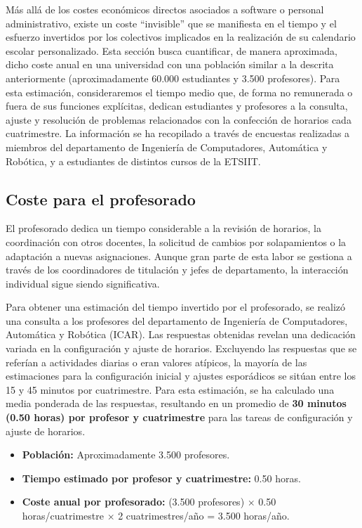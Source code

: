 Más allá de los costes económicos directos asociados a software o personal administrativo, existe un coste ``invisible'' que se manifiesta en el tiempo y el esfuerzo invertidos por los colectivos implicados en la realización de su calendario escolar personalizado. Esta sección busca cuantificar, de manera aproximada, dicho coste anual en una universidad con una población similar a la descrita anteriormente (aproximadamente 60.000 estudiantes y 3.500 profesores).
\newline\newline
Para esta estimación, consideraremos el tiempo medio que, de forma no remunerada o fuera de sus funciones explícitas, dedican estudiantes y profesores a la consulta, ajuste y resolución de problemas relacionados con la confección de horarios cada cuatrimestre. La información se ha recopilado a través de encuestas realizadas a miembros del departamento de Ingeniería de Computadores, Automática y Robótica, y a estudiantes de distintos cursos de la ETSIIT.

\subsection{Coste para el profesorado}

El profesorado dedica un tiempo considerable a la revisión de horarios, la coordinación con otros docentes, la solicitud de cambios por solapamientos o la adaptación a nuevas asignaciones. Aunque gran parte de esta labor se gestiona a través de los coordinadores de titulación y jefes de departamento, la interacción individual sigue siendo significativa.

Para obtener una estimación del tiempo invertido por el profesorado, se realizó una consulta a los profesores del departamento de Ingeniería de Computadores, Automática y Robótica (ICAR). Las respuestas obtenidas revelan una dedicación variada en la configuración y ajuste de horarios. Excluyendo las respuestas que se referían a actividades diarias o eran valores atípicos, la mayoría de las estimaciones para la configuración inicial y ajustes esporádicos se sitúan entre los 15 y 45 minutos por cuatrimestre. Para esta estimación, se ha calculado una media ponderada de las respuestas, resultando en un promedio de \textbf{30 minutos (0.50 horas) por profesor y cuatrimestre} para las tareas de configuración y ajuste de horarios.

\begin{itemize}
    \item \textbf{Población:} Aproximadamente 3.500 profesores.
    \item \textbf{Tiempo estimado por profesor y cuatrimestre:} 0.50 horas.
    \item \textbf{Coste anual por profesorado:} (3.500 profesores) $\times$ 0.50 horas/cuatrimestre $\times$ 2 cuatrimestres/año = 3.500 horas/año.
\end{itemize}


